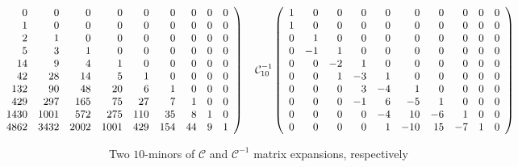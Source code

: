 
\begin{table}
    \begin{displaymath} 
        \hspace{-5.5cm}
        \mathcal{C}_{10} \left(\begin{array}{rrrrrrrrrr}
        1 & 0 & 0 & 0 & 0 & 0 & 0 & 0 & 0 & 0 \\
        1 & 1 & 0 & 0 & 0 & 0 & 0 & 0 & 0 & 0 \\
        2 & 2 & 1 & 0 & 0 & 0 & 0 & 0 & 0 & 0 \\
        5 & 5 & 3 & 1 & 0 & 0 & 0 & 0 & 0 & 0 \\
        14 & 14 & 9 & 4 & 1 & 0 & 0 & 0 & 0 & 0 \\
        42 & 42 & 28 & 14 & 5 & 1 & 0 & 0 & 0 & 0 \\
        132 & 132 & 90 & 48 & 20 & 6 & 1 & 0 & 0 & 0 \\
        429 & 429 & 297 & 165 & 75 & 27 & 7 & 1 & 0 & 0 \\
        1430 & 1430 & 1001 & 572 & 275 & 110 & 35 & 8 & 1 & 0 \\
        4862 & 4862 & 3432 & 2002 & 1001 & 429 & 154 & 44 & 9 & 1
        \end{array}\right) 
        \quad
        \mathcal{C}_{10}^{-1}\left(\begin{array}{rrrrrrrrrr}
        1 & 0 & 0 & 0 & 0 & 0 & 0 & 0 & 0 & 0 \\
        1 & 0 & 0 & 0 & 0 & 0 & 0 & 0 & 0 & 0 \\
        0 & 1 & 0 & 0 & 0 & 0 & 0 & 0 & 0 & 0 \\
        0 & -1 & 1 & 0 & 0 & 0 & 0 & 0 & 0 & 0 \\
        0 & 0 & -2 & 1 & 0 & 0 & 0 & 0 & 0 & 0 \\
        0 & 0 & 1 & -3 & 1 & 0 & 0 & 0 & 0 & 0 \\
        0 & 0 & 0 & 3 & -4 & 1 & 0 & 0 & 0 & 0 \\
        0 & 0 & 0 & -1 & 6 & -5 & 1 & 0 & 0 & 0 \\
        0 & 0 & 0 & 0 & -4 & 10 & -6 & 1 & 0 & 0 \\
        0 & 0 & 0 & 0 & 1 & -10 & 15 & -7 & 1 & 0
        \end{array}\right)
    \end{displaymath}

  \caption[$\mathcal{C}$ and $\mathcal{C}^{-1}$]{Two $10$-minors of
  $\mathcal{C}$ and $\mathcal{C}^{-1}$ matrix expansions, respectively}

  \label{tab:catalan:array} 

\end{table}
